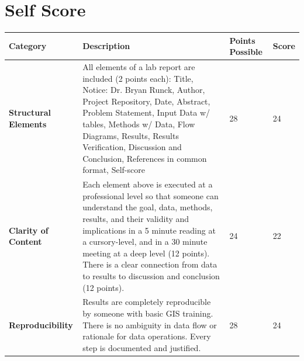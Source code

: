 \documentclass[article,12pt]{article}
\numberwithin{equation}{section}
\begin{document}
\section*{Self Score}
\begin{tabular}{|p{.2\linewidth}|p{.2\linewidth}|p{.2\linewidth}|p{.1\linewidth}|}
	\hline
	\textbf{Category}            & \textbf{Description}                                                                                                                                                                                                                                                                                                                                              & \textbf{Points Possible} & \textbf{Score} \\ \hline
\vspace{.2in}\textbf{Structural Elements} & {\tiny All elements of a lab report are included (2 points each): Title, Notice: Dr. Bryan Runck, Author, Project Repository, Date, Abstract, Problem Statement, Input Data w/ tables, Methods w/ Data, Flow Diagrams, Results, Results Verification, Discussion and Conclusion, References in common format, Self-score}                                        & \vspace{.2in}28              &   \vspace{.2in}24    \\ \hline
	\vspace{.2in}\textbf{Clarity of Content}  & {\tiny Each element above is executed at a professional level so that someone can understand the goal, data, methods, results, and their validity and implications in a 5 minute reading at a cursory-level, and in a 30 minute meeting at a deep level (12 points). There is a clear connection from data to results to discussion and conclusion (12 points).} & \vspace{.2in}24              &  \vspace{.2in}22     \\ \hline
	\vspace{.2in}\textbf{Reproducibility}     & {\tiny Results are completely reproducible by someone with basic GIS training. There is no ambiguity in data flow or rationale for data operations. Every step is documented and justified.}                                                                                                                                                                     & \vspace{.2in}28              &     \vspace{.2in}24  \\ \hline

\end{tabular}
\end{document}
